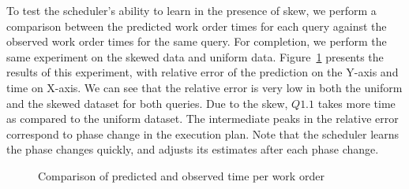 To test the scheduler's ability to learn in the presence of skew, we perform a comparison between the predicted work order times for each query against the observed work order times for the same query.
For completion, we perform the same experiment on the skewed data and uniform data. Figure~\ref{fig:pred-vs-observed-time-per-wo} presents the results of this experiment, with relative error of the prediction on the Y-axis and time on X-axis.
We can see that the relative error is very low in both the uniform and the skewed dataset for both queries. 
Due to the skew, $Q1.1$ takes more time as compared to the uniform dataset.
The intermediate peaks in the relative error correspond to phase change in the execution plan. 
Note that the scheduler learns the phase changes quickly, and adjusts its estimates after each phase change. 

\begin{figure}[b]
	\centering
	\vspace{-1em}
	\caption{Comparison of predicted and observed time per work order}
	\label{fig:pred-vs-observed-time-per-wo}
	\vspace{-1em}
\end{figure}

